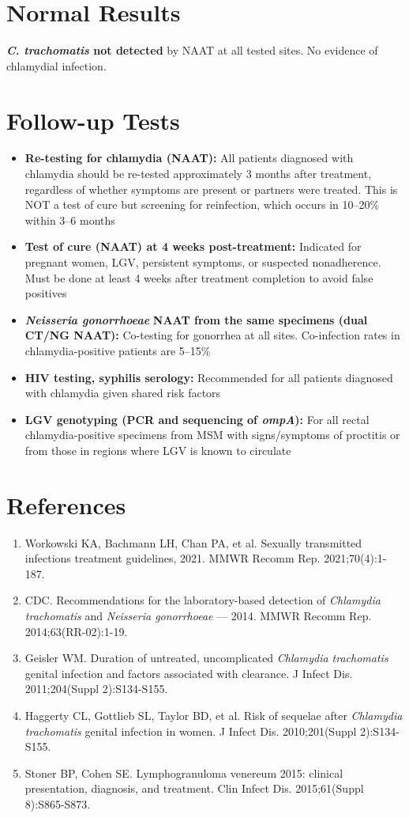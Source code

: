 \section*{Normal Results}
\textbf{\textit{C. trachomatis} not detected} by NAAT at all tested sites. No evidence of chlamydial infection.

\section*{Follow-up Tests}
\begin{itemize}
  \item \textbf{Re-testing for chlamydia (NAAT):} All patients diagnosed with chlamydia should be re-tested approximately 3 months after treatment, regardless of whether symptoms are present or partners were treated. This is NOT a test of cure but screening for reinfection, which occurs in 10--20\% within 3--6 months
  \item \textbf{Test of cure (NAAT) at 4 weeks post-treatment:} Indicated for pregnant women, LGV, persistent symptoms, or suspected nonadherence. Must be done at least 4 weeks after treatment completion to avoid false positives
  \item \textit{\textbf{Neisseria gonorrhoeae}} \textbf{NAAT from the same specimens (dual CT/NG NAAT):} Co-testing for gonorrhea at all sites. Co-infection rates in chlamydia-positive patients are 5--15\%
  \item \textbf{HIV testing, syphilis serology:} Recommended for all patients diagnosed with chlamydia given shared risk factors
  \item \textbf{LGV genotyping (PCR and sequencing of \textit{ompA}):} For all rectal chlamydia-positive specimens from MSM with signs/symptoms of proctitis or from those in regions where LGV is known to circulate
\end{itemize}

\section*{References}
\begin{enumerate}
  \item Workowski KA, Bachmann LH, Chan PA, et al. Sexually transmitted infections treatment guidelines, 2021. MMWR Recomm Rep. 2021;70(4):1-187.
  \item CDC. Recommendations for the laboratory-based detection of \textit{Chlamydia trachomatis} and \textit{Neisseria gonorrhoeae} --- 2014. MMWR Recomm Rep. 2014;63(RR-02):1-19.
  \item Geisler WM. Duration of untreated, uncomplicated \textit{Chlamydia trachomatis} genital infection and factors associated with clearance. J Infect Dis. 2011;204(Suppl 2):S134-S155.
  \item Haggerty CL, Gottlieb SL, Taylor BD, et al. Risk of sequelae after \textit{Chlamydia trachomatis} genital infection in women. J Infect Dis. 2010;201(Suppl 2):S134-S155.
  \item Stoner BP, Cohen SE. Lymphogranuloma venereum 2015: clinical presentation, diagnosis, and treatment. Clin Infect Dis. 2015;61(Suppl 8):S865-S873.
\end{enumerate}

\clearpage
